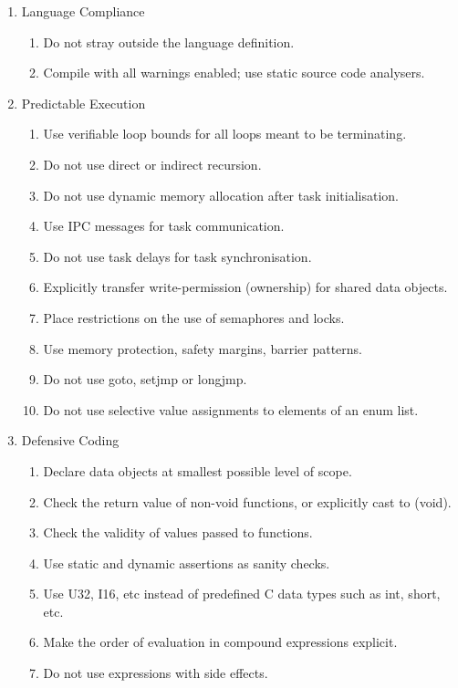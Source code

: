 \documentclass[11pt]{article}
\begin{document}
\begin{enumerate}

 \item Language Compliance 
  \begin{enumerate}
   \item Do not stray outside the language definition. 
  \item Compile with all warnings enabled; use static source code analysers. 
  \end{enumerate}

 \item Predictable Execution 
 \begin{enumerate}
  \item Use verifiable loop bounds for all loops meant to be terminating. 
  \item Do not use direct or indirect recursion. 
  \item Do not use dynamic memory allocation after task initialisation. 
  \item Use IPC messages for task communication. 
  \item Do not use task delays for task synchronisation. 
  \item Explicitly transfer write-permission (ownership) for shared data objects. 
  \item Place restrictions on the use of semaphores and locks. 
  \item Use memory protection, safety margins, barrier patterns. 
  \item Do not use goto, setjmp or longjmp. 
  \item Do not use selective value assignments to elements of an enum list. 
 \end{enumerate}

 \item Defensive Coding 
 \begin{enumerate}
  \item Declare data objects at smallest possible level of scope. 
  \item Check the return value of non-void functions, or explicitly cast to (void). 
  \item Check the validity of values passed to functions. 
  \item Use static and dynamic assertions as sanity checks. 
  \item Use U32, I16, etc instead of predefined C data types such as int, short, etc. 
  \item Make the order of evaluation in compound expressions explicit. 
  \item Do not use expressions with side effects. 
 \end{enumerate}


\end{enumerate}
\end{document}

